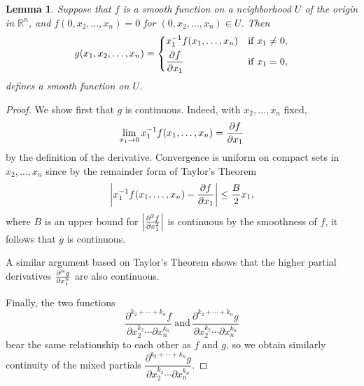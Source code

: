 \documentclass[12pt,reqno]{book}%
\newtheorem{lemma}{Lemma}[chapter]
\theoremstyle{definition}
\theoremstyle{remark}
\theoremstyle{theorem}
\theoremstyle{remark}
\begin{document}
\begin{lemma}\label{lem6.1}%
    Suppose that $f$ is a smooth function on a neighborhood $U$ of the origin in $\mathbb{R}^{n}$, and $f(0, x_2, \ldots, x_n) = 0$ for $(0, x_2, \ldots, x_n) \in U$.
    Then
    \[
        g(x_1, x_2, \ldots, x_n) =
        \begin{dcases}
            x_{1}^{-1}f(x_1, \ldots, x_n) & \text{if} \ x_1 \neq 0, \\
            \pdv{f}{x_1}(0, x_2, \ldots, x_n) & \text{if} \ x_1 = 0,
        \end{dcases}
    \]
    defines a smooth function on $U$.
\end{lemma}%
\begin{proof}%
    We show first that $g$ is continuous.
    Indeed, with $x_2, \ldots, x_n$ fixed,
    \[
        \lim_{x_1 \to 0} x_1^{-1} f(x_1, \ldots, x_n) = \pdv{f}{x_1}(0, x_2, \ldots, x_n)
    \]
    by the definition of the derivative.
    Convergence is uniform on compact sets in $x_2, \ldots, x_n$ since by the remainder form of Taylor's Theorem
    \[
        {\left|x_1^{-1} f(x_1, \ldots, x_n) - \pdv{f}{x_1}(0, x_2, \ldots, x_n)\right|} \leq \frac{B}{2} x_1,
    \]
    where $B$ is an upper bound for ${\left| \pdv[2]{f}{x_1}(0, x_2, \ldots, x_n)\right|}$ is continuous by the smoothness of $f$, it follows that $g$ is continuous.

    A similar argument based on Taylor's Theorem shows that the higher partial derivatives $ \pdv[n]{g}{x_1}$ are also continuous.

    Finally, the two functions
    \[
        \frac{\partial^{k_2 + \cdots + k_n}f}{\partial x_2^{k_2} \cdots \partial x_n^{k_n}} \ \text{and} \, \frac{\partial^{k_2 + \cdots + k_n}g}{\partial x_2^{k_2} \cdots \partial x_n^{k_n}}
    \]
    bear the same relationship to each other as \(f\) and $g$, so we obtain similarly continuity of the mixed partials \(\dfrac{\partial^{k_2 + \cdots + k_n}g}{\partial x_2^{k_2} \cdots \partial x_n^{k_n}}\).
\end{proof}%
\end{document}
